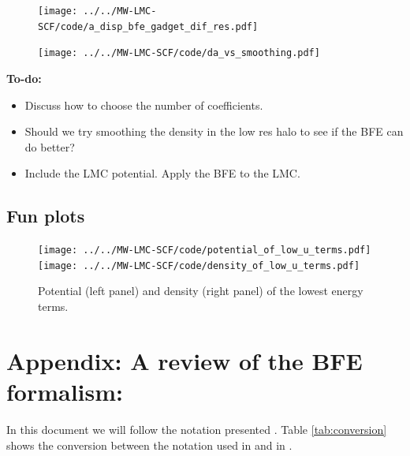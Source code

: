 \documentclass[14pt]{article}
\begin{document}
\begin{figure}[H]
  \centering
  \texttt{[image: ../../MW-LMC-SCF/code/a\_disp\_bfe\_gadget\_dif\_res.pdf]}
\end{figure}

\begin{figure}[H]
  \centering
  \texttt{[image: ../../MW-LMC-SCF/code/da\_vs\_smoothing.pdf]}
\end{figure}

\textbf{To-do:}\\




\begin{itemize}
  
  \item Discuss how to choose the number of coefficients.
  \item Should we try smoothing the density in the low res halo to see if the
    BFE can do better? 
  \item Include the LMC potential. Apply the BFE to the LMC.
\end{itemize}


\subsection{Fun plots}



\begin{figure}[H]
  \centering
  \texttt{[image: ../../MW-LMC-SCF/code/potential\_of\_low\_u\_terms.pdf]}
  \texttt{[image: ../../MW-LMC-SCF/code/density\_of\_low\_u\_terms.pdf]}
  \caption{Potential (left panel) and density (right panel) of the lowest energy terms.}
\end{figure}





\appendix


\section*{Appendix: A review of the BFE formalism:}\label{sec:appendix}

In this document we will follow the notation presented \cite{Lowing11}. Table
\ref{tab:conversion} shows the conversion between the notation used in \cite{Hernquist92} and
in \cite{Lowing11}.
\end{document}
